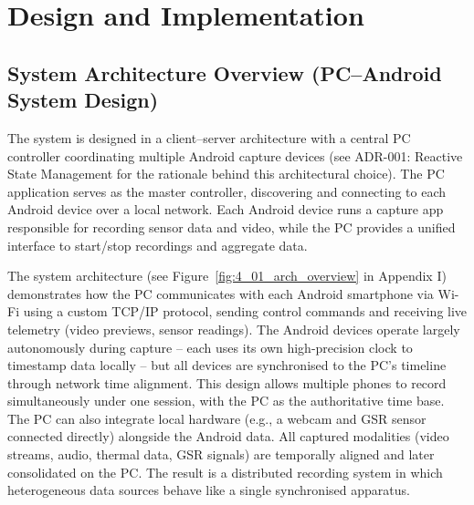 \chapter{Design and Implementation}\label{chap:design-implementation}


\section{System Architecture Overview (PC--Android System Design)}\label{sec:4-1}
The system is designed in a client--server architecture with a central PC controller coordinating multiple Android capture devices (see ADR-001: Reactive State Management for the rationale behind this architectural choice). The PC application serves as the master controller, discovering and connecting to each Android device over a local network. Each Android device runs a capture app responsible for recording sensor data and video, while the PC provides a unified interface to start/stop recordings and aggregate data.

The system architecture (see Figure~\ref{fig:4_01_arch_overview} in Appendix I) demonstrates how the PC communicates with each Android smartphone via Wi-Fi using a custom TCP/IP protocol, sending control commands and receiving live telemetry (video previews, sensor readings). The Android devices operate largely autonomously during capture -- each uses its own high-precision clock to timestamp data locally -- but all devices are synchronised to the PC's timeline through network time alignment. This design allows multiple phones to record simultaneously under one session, with the PC as the authoritative time base. The PC can also integrate local hardware (e.g., a webcam and GSR sensor connected directly) alongside the Android data. All captured modalities (video streams, audio, thermal data, GSR signals) are temporally aligned and later consolidated on the PC. The result is a distributed recording system in which heterogeneous data sources behave like a single synchronised apparatus.


